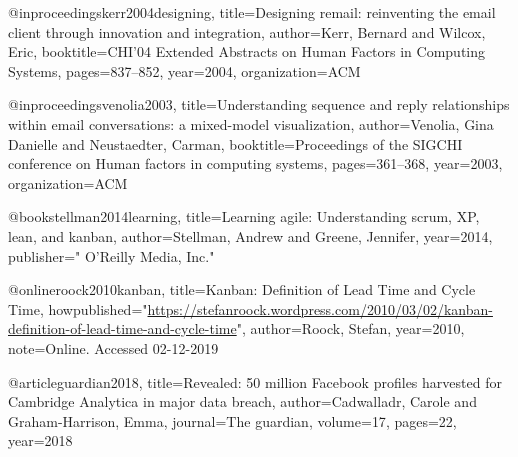 @inproceedings{kerr2004designing,
  title={{Designing remail: reinventing the email client through innovation and integration}},
  author={Kerr, Bernard and Wilcox, Eric},
  booktitle={CHI'04 Extended Abstracts on Human Factors in Computing Systems},
  pages={837--852},
  year={2004},
  organization={ACM}
}

@inproceedings{venolia2003,
  title={{Understanding sequence and reply relationships within email conversations: a mixed-model visualization}},
  author={Venolia, Gina Danielle and Neustaedter, Carman},
  booktitle={Proceedings of the SIGCHI conference on Human factors in computing systems},
  pages={361--368},
  year={2003},
  organization={ACM}
}

@book{stellman2014learning,
  title={{Learning agile: Understanding scrum, XP, lean, and kanban}},
  author={Stellman, Andrew and Greene, Jennifer},
  year={2014},
  publisher={" O'Reilly Media, Inc."}
}

@online{roock2010kanban,
  title={{Kanban: Definition of Lead Time and Cycle Time}},
  howpublished="\url{https://stefanroock.wordpress.com/2010/03/02/kanban-definition-of-lead-time-and-cycle-time}",
  author={Roock, Stefan},
  year={2010},
  note={Online. Accessed 02-12-2019}
}

@article{guardian2018,
  title={Revealed: 50 million Facebook profiles harvested for Cambridge Analytica in major data breach},
  author={Cadwalladr, Carole and Graham-Harrison, Emma},
  journal={The guardian},
  volume={17},
  pages={22},
  year={2018}
}